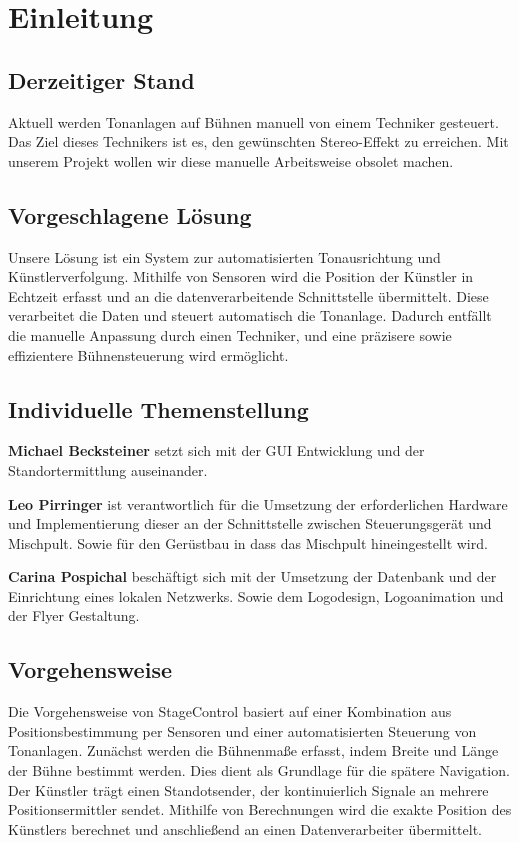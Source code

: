\chapter{Einleitung}
\section{Derzeitiger Stand}
Aktuell werden Tonanlagen auf Bühnen manuell von einem Techniker gesteuert. Das Ziel dieses Technikers ist es, den gewünschten Stereo-Effekt zu erreichen. Mit unserem Projekt wollen wir diese manuelle Arbeitsweise obsolet machen.

\section{Vorgeschlagene Lösung}
Unsere Lösung ist ein System zur automatisierten Tonausrichtung und Künstlerverfolgung. Mithilfe von Sensoren wird die Position der Künstler in Echtzeit erfasst und an die datenverarbeitende Schnittstelle übermittelt. Diese verarbeitet die Daten und steuert automatisch die Tonanlage. Dadurch entfällt die manuelle Anpassung durch einen Techniker, und eine präzisere sowie effizientere Bühnensteuerung wird ermöglicht.

\section{Individuelle Themenstellung}
\textbf{Michael Becksteiner} setzt sich mit der GUI Entwicklung und der Standortermittlung auseinander. 

\textbf{Leo Pirringer} ist verantwortlich für die Umsetzung der erforderlichen Hardware und Implementierung dieser an der Schnittstelle zwischen Steuerungsgerät und Mischpult. Sowie für den Gerüstbau in dass das Mischpult hineingestellt wird.

\textbf{Carina Pospichal} beschäftigt sich mit der Umsetzung der Datenbank und der Einrichtung eines lokalen Netzwerks. Sowie dem Logodesign, Logoanimation und der Flyer Gestaltung. 

\section{Vorgehensweise} 
Die Vorgehensweise von StageControl basiert auf einer Kombination aus Positionsbestimmung per Sensoren und einer automatisierten Steuerung von Tonanlagen. Zunächst werden die Bühnenmaße erfasst, indem Breite und Länge der Bühne bestimmt werden. Dies dient als Grundlage für die spätere Navigation. Der Künstler trägt einen Standotsender, der kontinuierlich Signale an mehrere Positionsermittler sendet. Mithilfe von Berechnungen wird die exakte Position des Künstlers berechnet und anschließend an einen Datenverarbeiter übermittelt.  

